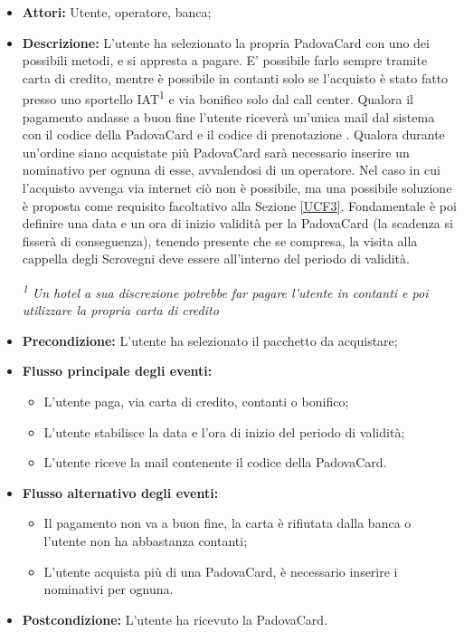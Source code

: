 \begin{itemize}
\item \textbf{Attori:} Utente, operatore, banca;
\item \textbf{Descrizione:} L'utente ha selezionato la propria PadovaCard con uno dei possibili metodi, e si appresta a pagare. E' possibile farlo sempre tramite carta di credito, mentre è possibile  in contanti solo se l'acquisto è stato fatto presso uno sportello IAT\textsuperscript{1}  e via bonifico solo dal call center. Qualora il pagamento andasse a buon fine l'utente riceverà un'unica mail dal sistema con il codice della PadovaCard e il codice di prenotazione \tlite. Qualora durante un'ordine siano acquistate più PadovaCard sarà necessario inserire un nominativo per ognuna di esse, avvalendosi di un operatore. Nel caso in cui l'acquisto avvenga via internet ciò non è possibile, ma una possibile soluzione è proposta come requisito facoltativo alla Sezione \ref{UCF3}.
Fondamentale è poi definire una data e un ora di inizio validità per la PadovaCard (la scadenza si fisserà di conseguenza), tenendo presente che se compresa, la visita alla cappella degli Scrovegni deve essere all'interno del periodo di validità.\\
\begin{footnotesize}
\textit{\textsuperscript{1} Un hotel a sua discrezione potrebbe far pagare l'utente in contanti e poi utilizzare la propria carta di credito}
\end{footnotesize}
\item \textbf{Precondizione:} L'utente ha selezionato il pacchetto da acquistare;
\item \textbf{Flusso principale degli eventi:}
	\begin{itemize}
		\item L'utente paga, via carta di credito, contanti o bonifico;
        \item L'utente stabilisce la data e l'ora di inizio del periodo di validità;
		\item L'utente riceve la mail contenente il codice della PadovaCard.
	\end{itemize}
    \item \textbf{Flusso alternativo degli eventi:}
	\begin{itemize}
    	\item Il pagamento non va a buon fine, la carta è rifiutata dalla banca o l'utente non ha abbastanza contanti;
		\item L'utente acquista più di una PadovaCard, è necessario inserire i nominativi per ognuna.
	\end{itemize}
\item \textbf{Postcondizione:} L'utente ha ricevuto la PadovaCard.
\end{itemize}

